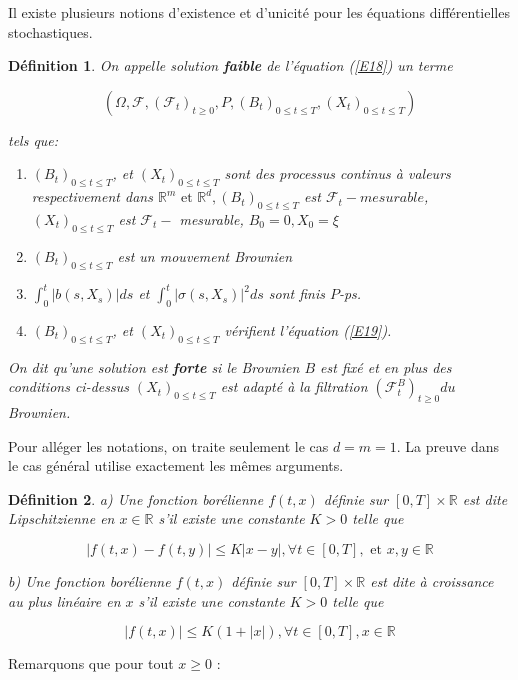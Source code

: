 \documentclass[A4paper,12pt]{report}
\newtheorem{definition}{D\'efinition}[chapter]
\newcommand{\R}{{\mathbb{R}}}
\begin{document}
Il existe plusieurs notions d’existence et d’unicité pour les équations différentielles stochastiques.
\begin{definition} On appelle solution \textbf{faible} de l'équation (\ref{E18}) un terme

$$
\left(\Omega, \mathcal{F},\left(\mathcal{F}_{t}\right)_{t \geq 0}, P,\left(B_{t}\right)_{0 \leq t \leq T},\left(X_{t}\right)_{0 \leq t \leq T}\right)
$$

tels que:

\begin{enumerate}
  \item $\left(B_{t}\right)_{0 \leq t \leq T}$, et $\left(X_{t}\right)_{0 \leq t \leq T}$ sont des processus continus à valeurs respectivement dans $\mathbb{R}^{m} \text{ et } \R^d ,\left(B_{t}\right)_{0 \leq t \leq T}$ est $\mathcal{F}_{t}-m e s u r a b l e$, $\left(X_{t}\right)_{0 \leq t \leq T}$ est $\mathcal{F}_{t}-$ mesurable, $B_{0}=0, X_{0}= \xi$

  \item $\left(B_{t}\right)_{0 \leq t \leq T}$ est un mouvement Brownien

  \item $\int_{0}^{t} \left|b\left(s, X_{s}\right)\right|ds  $ et $ \int_{0}^{t}\left|\sigma\left(s, X_{s}\right)\right|^{2} d s$ sont finis $P$-ps.

  \item $\left(B_{t}\right)_{0 \leq t \leq T}$, et $\left(X_{t}\right)_{0 \leq t \leq T}$ vérifient l'équation (\ref{E19}).

\end{enumerate}
On dit qu'une solution est \textbf{forte} si le Brownien $B$ est fixé et en plus des conditions ci-dessus $\left(X_{t}\right)_{0 \leq t \leq T}$ est adapté à la filtration $\left(\mathcal{F}_{t}^{B}\right)_{t \geq 0} d u$ Brownien.
\end{definition}
Pour alléger les notations, on traite seulement le cas  $d = m = 1$. La preuve dans le cas général utilise exactement les mêmes arguments.

\begin{definition}
a) Une fonction borélienne $f(t, x)$ définie sur $[0, T]\times \R$ est dite Lipschitzienne en $x \in \R$ s'il existe une constante $K>0$ telle que

\begin{equation}\label{E21}
|f(t, x)-f(t, y)| \leq K|x-y|, \forall t \in [0, T], \text{ et }  x, y \in \R
\end{equation}


b) Une fonction borélienne $f(t, x)$ définie sur $[0, T] \times \R$ est dite à croissance au plus linéaire en $x$ s'il existe une constante $K>0$ telle que

\begin{equation}\label{E20}
|f(t, x)| \leq K(1+|x|), \forall t \in [0, T], x \in \R
\end{equation}

\end{definition}
Remarquons que pour tout $x \geq 0$ :
\end{document}
